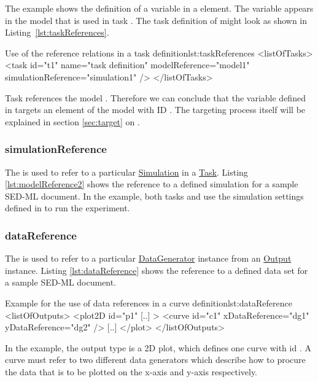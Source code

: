 The example shows the definition of a variable  in a  element. The variable appears in the model that is used in task . The task definition of  might look as shown in Listing~\ref{lst:taskReferences}.

\begin{myXmlLst}{Use of the reference relations in a task definition}{lst:taskReferences}
<listOfTasks>
	<task id="t1" name="task definition" modelReference="model1" simulationReference="simulation1" />
</listOfTasks>
\end{myXmlLst}
Task  references the model . Therefore we can conclude that the variable  defined in  targets an element of the model with ID . The targeting process itself will be explained in section \ref{sec:target} on .


\subsubsection{simulationReference}
\label{sec:simulationReference}
The  is used to refer to a particular \hyperref[class:simulation]{Simulation} in a \hyperref[class:task]{Task}. Listing \ref{lst:modelReference2} shows the reference to a defined simulation for a sample SED-ML document. In the example, both tasks  and  use the simulation settings defined in  to run the experiment.


\subsubsection{dataReference}
\label{sec:dataReference}
The  is used to refer to a particular \hyperref[class:dataGenerator]{DataGenerator} instance from an \hyperref[class:output]{Output} instance. Listing \ref{lst:dataReference} shows the reference to a defined data set for a sample SED-ML document. 

\begin{myXmlLst}{Example for the use of data references in a curve definition}{lst:dataReference}
<listOfOutputs>
	<plot2D id="p1" [..] >
    		<curve id="c1" xDataReference="dg1" yDataReference="dg2" />
		[..]
	</plot>
</listOfOutputs>
\end{myXmlLst}

In the example, the output type is a 2D plot, which defines one curve with id . A curve must refer to two different data generators which describe how to procure the data that is to be plotted on the x-axis and y-axis respectively. 

